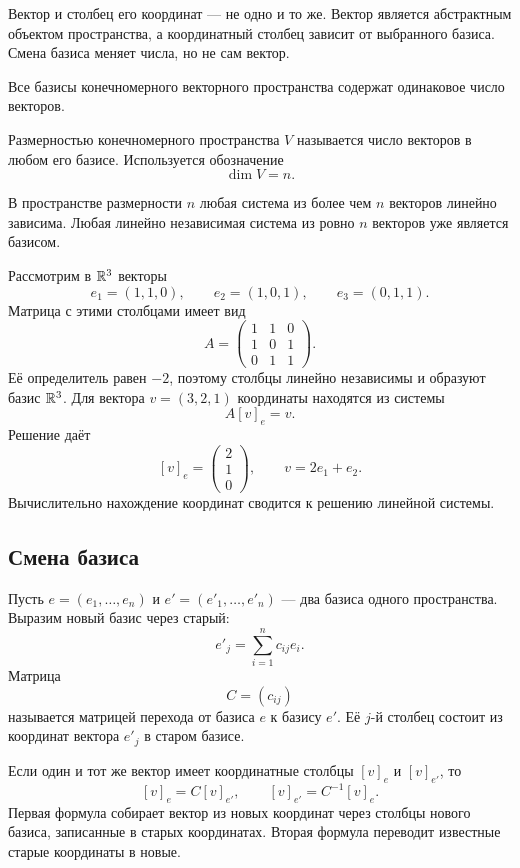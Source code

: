 Вектор и столбец его координат --- не одно и то же. Вектор является абстрактным объектом пространства, а координатный столбец зависит от выбранного базиса. Смена базиса меняет числа, но не сам вектор.

\begin{theorem}
Все базисы конечномерного векторного пространства содержат одинаковое число векторов.
\end{theorem}

\begin{definition}
Размерностью конечномерного пространства \(V\) называется число векторов в любом его базисе. Используется обозначение
\[
\dim V=n.
\]
\end{definition}

В пространстве размерности \(n\) любая система из более чем \(n\) векторов линейно зависима. Любая линейно независимая система из ровно \(n\) векторов уже является базисом.

\begin{example}
Рассмотрим в \(\mathbb{R}^3\) векторы
\[
e_1=(1,1,0),
\qquad
e_2=(1,0,1),
\qquad
e_3=(0,1,1).
\]
Матрица с этими столбцами имеет вид
\[
A=
\begin{pmatrix}
1&1&0\\
1&0&1\\
0&1&1
\end{pmatrix}.
\]
Её определитель равен \(-2\), поэтому столбцы линейно независимы и образуют базис \(\mathbb{R}^3\). Для вектора \(v=(3,2,1)\) координаты находятся из системы
\[
A[v]_e=v.
\]
Решение даёт
\[
[v]_e=
\begin{pmatrix}
2\\1\\0
\end{pmatrix},
\qquad
v=2e_1+e_2.
\]
Вычислительно нахождение координат сводится к решению линейной системы.
\end{example}

\subsection{Смена базиса}

Пусть \(e=(e_1,\dots,e_n)\) и \(e'=(e'_1,\dots,e'_n)\) --- два базиса одного пространства. Выразим новый базис через старый:
\[
e'_j=\sum_{i=1}^n c_{ij}e_i.
\]
Матрица
\[
C=(c_{ij})
\]
называется матрицей перехода от базиса \(e\) к базису \(e'\). Её \(j\)-й столбец состоит из координат вектора \(e'_j\) в старом базисе.

Если один и тот же вектор имеет координатные столбцы \([v]_e\) и \([v]_{e'}\), то
\[
[v]_e=C[v]_{e'},
\qquad
[v]_{e'}=C^{-1}[v]_e.
\]
Первая формула собирает вектор из новых координат через столбцы нового базиса, записанные в старых координатах. Вторая формула переводит известные старые координаты в новые.

